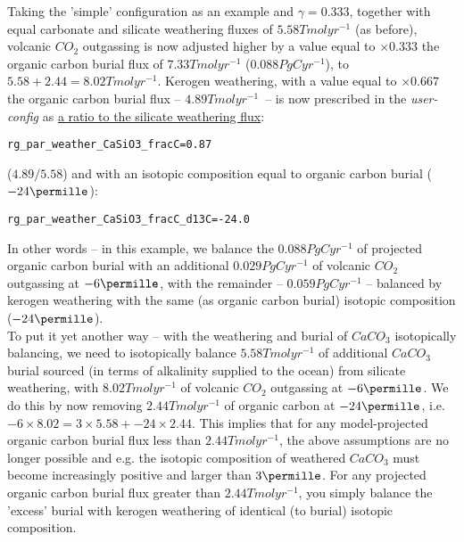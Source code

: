 \begin{enumerate}[noitemsep]
Taking the 'simple' configuration as an example and \(\gamma=0.333\), together with equal carbonate and silicate weathering fluxes of \(5.58Tmolyr^{-1}\) (as before),  volcanic \(CO_{2}\) outgassing is now adjusted higher by a value equal to  \(\times0.333\) the organic carbon burial flux of \(7.33Tmolyr^{-1}\) (\(0.088 PgCyr^{-1}\)), to \(5.58 + 2.44 = 8.02Tmolyr^{-1}\). Kerogen weathering, with a value equal to \(\times0.667\) the organic carbon burial flux -- \(4.89Tmolyr^{-1}\)\ -- is now prescribed in the \textit{user-config} as \uline{a ratio to the silicate weathering flux}:
\vspace{-1mm}\small\begin{verbatim}
rg_par_weather_CaSiO3_fracC=0.87
\end{verbatim}\normalsize\vspace{-1mm}
(\(4.89/5.58\)) and with an isotopic composition equal to organic carbon burial (\(-24\permille\)):
\vspace{-1mm}\small\begin{verbatim}
rg_par_weather_CaSiO3_fracC_d13C=-24.0
\end{verbatim}\normalsize\vspace{-1mm}
\vspace{1mm}
In other words -- in this example, we balance the \(0.088 PgCyr^{-1}\) of projected organic carbon burial with an additional \(0.029 PgCyr^{-1}\) of volcanic \(CO_{2}\) outgassing at \(-6\permille\), with the remainder -- \(0.059 PgCyr^{-1}\) -- balanced by kerogen weathering with the same (as organic carbon burial) isotopic composition (\(-24\permille\)). 
\vspace{1mm}
\\To put it yet another way -- with the weathering and burial of \(CaCO_{3}\) isotopically balancing, we need to isotopically balance \(5.58Tmolyr^{-1}\) of additional \(CaCO_{3}\) burial sourced (in terms of alkalinity supplied to the ocean) from silicate weathering, with \(8.02Tmolyr^{-1}\) of volcanic \(CO_{2}\) outgassing at \(-6\permille\). We do this by now removing \(2.44Tmolyr^{-1}\) of organic carbon at \(-24\permille\), i.e. \(-6\times8.02=3\times5.58+-24\times2.44\). This  implies that for any model-projected organic carbon burial flux less than \(2.44Tmolyr^{-1}\), the above assumptions are no longer possible and e.g. the isotopic composition of weathered \(CaCO_{3}\) must become increasingly positive and larger than \(3\permille\). For any projected organic carbon burial flux greater than \(2.44Tmolyr^{-1}\), you simply balance the 'excess' burial with kerogen weathering of  identical (to burial) isotopic composition.


\end{enumerate}
